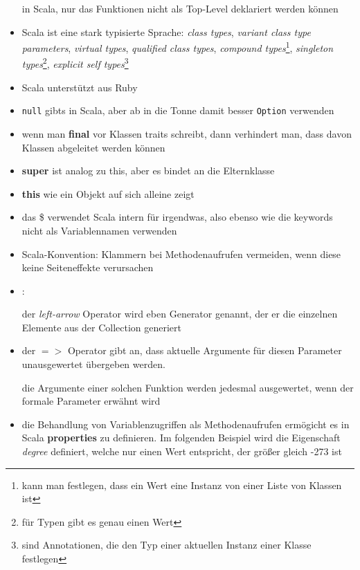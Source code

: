 \begin{itemize}
  in Scala, nur das Funktionen nicht als Top-Level deklariert werden können
  \item Scala ist eine stark typisierte Sprache: \textit{class types},
  \textit{variant class type parameters}, \textit{virtual types}, 
  \textit{qualified class types},  \textit{compound types}\footnote{kann
  man festlegen, dass ein Wert eine Instanz von einer Liste von Klassen
  ist}, \textit{singleton types}\footnote{für Typen gibt es genau einen
  Wert}, \textit{explicit self types}\footnote{sind Annotationen, die den Typ 
  einer aktuellen Instanz einer Klasse festlegen}
  \item Scala unterstützt  aus Ruby
  \item \texttt{null} gibts in Scala, aber ab in die Tonne damit \und 
  besser \texttt{Option} verwenden
  \item wenn man \textbf{final} vor Klassen \oder traits schreibt, dann
  verhindert man, dass davon Klassen abgeleitet werden können
  \item \textbf{super} ist analog zu this, aber es bindet an die Elternklasse
  \item \textbf{this} wie ein Objekt auf sich alleine zeigt
  \item das \$ verwendet Scala intern für irgendwas, also ebenso wie
  die keywords nicht als Variablennamen verwenden
  \item Scala-Konvention: Klammern bei Methodenaufrufen vermeiden, wenn
  diese keine Seiteneffekte verursachen
  \item {}:
  
  
  
  der \textit{left-arrow} Operator wird eben Generator genannt, der er die
  einzelnen Elemente aus der Collection generiert
  \item der $=>$ Operator gibt an, dass aktuelle Argumente für diesen Parameter
  unausgewertet übergeben werden.
    
  die Argumente einer solchen Funktion werden jedesmal ausgewertet, wenn der
  formale Parameter erwähnt wird
  
    
  \item die Behandlung von Variablenzugriffen als Methodenaufrufen ermögicht
  es in Scala \textbf{properties} zu definieren. Im folgenden Beispiel wird
  die Eigenschaft \textit{degree} definiert, welche nur einen Wert entspricht,
  der größer \oder gleich -273 ist
  

\end{itemize}
